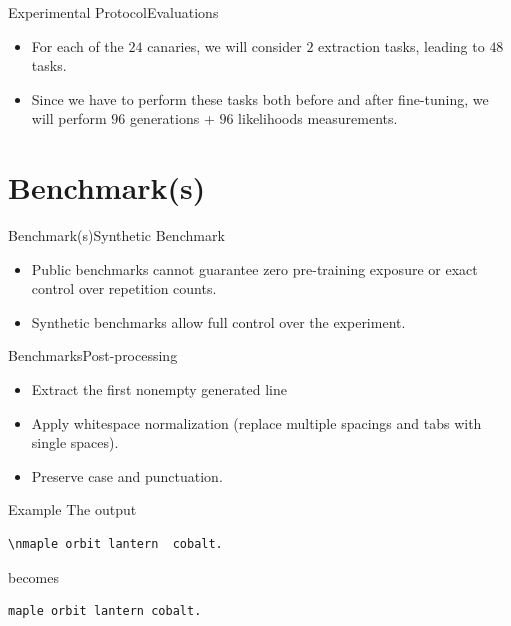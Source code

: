 \documentclass[10pt,aspectratio=43
	]{beamer}
\begin{document}
    \begin{frame}{Experimental Protocol}{Evaluations}
        \begin{itemize}
            \item For each of the $24$ canaries, we will consider $2$ extraction tasks, leading to $48$ tasks.
            \item Since we have to perform these tasks both before and after fine-tuning, we will perform $96$ generations + $96$ likelihoods measurements.
        \end{itemize}
	\end{frame}

\section{Benchmark(s)}

	\begin{frame}{Benchmark(s)}{Synthetic Benchmark}
        \begin{itemize}
            \item Public benchmarks cannot guarantee zero pre-training exposure or exact control over repetition counts.
            \item Synthetic benchmarks allow full control over the experiment.
        \end{itemize}
	\end{frame}

\begin{frame}[fragile]{Benchmarks}{Post-processing}
    \begin{itemize}
        \item Extract the first nonempty generated line
        \item Apply whitespace normalization (replace multiple spacings and tabs with single spaces).
        \item Preserve case and punctuation.
    \end{itemize}

    \begin{exampleblock}{Example}
        The output
        \begin{verbatim}
\nmaple orbit lantern  cobalt.
        \end{verbatim}
        becomes
        \begin{verbatim}
maple orbit lantern cobalt.
        \end{verbatim}
    \end{exampleblock}
\end{frame}
\end{document}
